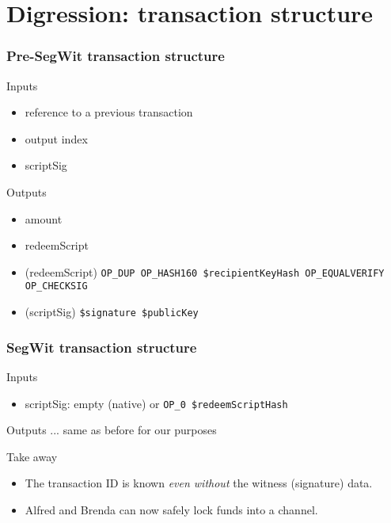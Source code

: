 \documentclass{beamer}
\begin{document}
\section{Digression: transaction structure}
\begin{frame}
	\frametitle{Pre-SegWit transaction structure}
	\begin{block}{Inputs}
		\begin{itemize}
			\item reference to a previous transaction \pause
			\item output index \pause
			\item scriptSig \pause
		\end{itemize}
	\end{block}
	\begin{block}{Outputs}
		\begin{itemize}
			\item amount \pause
			\item redeemScript \pause 
		\end{itemize}
	\end{block}
	\begin{example}[P2KH script]
		\begin{itemize}
			\item (redeemScript) {\tiny \texttt{OP\_DUP OP\_HASH160 \$recipientKeyHash OP\_EQUALVERIFY OP\_CHECKSIG}}
			\item (scriptSig) {\tiny\texttt{\$signature \$publicKey}}
		\end{itemize}
	\end{example}
\end{frame}
\begin{frame}
	\frametitle{SegWit transaction structure}
	\begin{block}{Inputs} 
		\begin{itemize}
			\item scriptSig: empty (native) or {\tiny \texttt{OP\_0 \$redeemScriptHash}} \pause
		\end{itemize}
	\end{block}
	\begin{block}{Outputs}
		... same as before for our purposes \pause
	\end{block}
	\begin{block}{Take away}
		\begin{itemize}
			\item The transaction ID is known \emph{even without} the witness (signature) data. \pause
			\item Alfred and Brenda can now safely lock funds into a channel.
		\end{itemize}
	\end{block}
\end{frame}
\end{document}
